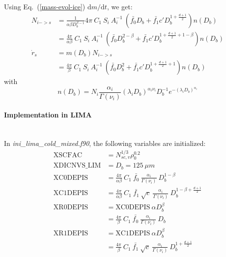 Using Eq.\ (\ref{mass-evol-ice}) $\mathrm{d}m/\mathrm{d}t$, we get:
\begin{align}
 N_{i->s} &= \frac{1}{\alpha\beta D_b^{\beta -1}} 4\pi ~ C_1 ~ S_i ~ A_i^{-1} ~ ( \bar{f_0} D_b + \bar{f_1} c' D_b^{1+\frac{d+1}{2}} ) n(D_b) \\
 &= \frac{4\pi}{\alpha\beta} ~ C_1 ~ S_i ~ A_i^{-1} ~ ( \bar{f_0} D_b^{2-\beta} + \bar{f_1} c' D_b^{1+\frac{d+1}{2}+1-\beta} ) n(D_b)     \\
 \dot{r}_s &= m(D_b)N_{i->s} \\
 &= \frac{4\pi}{\beta} ~ C_1 ~ S_i ~ A_i^{-1} ~ ( \bar{f_0} D_b^{2} + \bar{f_1} c' D_b^{1+\frac{d+1}{2}+1} ) n(D_b)    \label{rpoint-harrington}
\end{align}
with
\begin{equation}
 n(D_b) = N_i \frac{\alpha_i}{\Gamma(\nu_i)} (\lambda_iD_b)^{\alpha_i\nu_i} D_b^{-1} e^{-(\lambda_iD_b)^{\alpha_i}}
\end{equation}

\paragraph{Implementation in LIMA}
~\\
In \emph{ini\_lima\_cold\_mixed.f90}, the following variables are initialized:
\begin{align}
 \mathrm{XSCFAC} &= N_{sc,v}^{1/3} \rho_0^{0.2} \\
 \mathrm{XDICNVS\_LIM} &= D_b = 125 ~ \mu m \\
 \mathrm{XC0DEPIS} &= \frac{4\pi}{\alpha\beta} ~ C_1 ~ \bar{f_0} ~ \frac{\alpha_i}{\Gamma(\nu_i)} ~ D_b^{1-\beta}   \\
 \mathrm{XC1DEPIS} &= \frac{4\pi}{\alpha\beta} ~ C_1 ~ \bar{f_1} ~ \sqrt{c} ~ \frac{\alpha_i}{\Gamma(\nu_i)} ~ D_b^{1-\beta+\frac{d+1}{2}}   \\
 \mathrm{XR0DEPIS} &= \mathrm{XC0DEPIS} ~ \alpha D_b^\beta \\
          &= \frac{4\pi}{\beta} ~ C_1 ~ \bar{f_0} ~ \frac{\alpha_i}{\Gamma(\nu_i)} ~ D_b   \\
 \mathrm{XR1DEPIS} &= \mathrm{XC1DEPIS} ~ \alpha D_b^\beta \\
          &= \frac{4\pi}{\beta} ~ C_1 ~ \bar{f_1} ~ \sqrt{c} ~ \frac{\alpha_i}{\Gamma(\nu_i)} ~ D_b^{1+\frac{d+1}{2}}   \\
\end{align}

